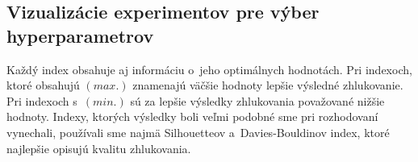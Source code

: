 \documentclass[a4paper,twoside,slovak,12pt,appendix]{article}
\begin{document}
\begin{appendices}
\newpage\null\thispagestyle{empty}\newpage


\newpage
\section{Vizualizácie experimentov pre výber hyperparametrov}
\label{c:clustering-hyperparameters-experiments}
Každý index obsahuje aj informáciu o~jeho optimálnych hodnotách. Pri indexoch,
ktoré obsahujú $(max.)$ znamenajú väčšie hodnoty lepšie výsledné zhlukovanie.
Pri indexoch s~$(min.)$ sú za lepšie výsledky zhlukovania považované nižšie
hodnoty. Indexy, ktorých výsledky boli veľmi podobné sme pri rozhodovaní
vynechali, používali sme najmä Silhouetteov a~Davies-Bouldinov index, ktoré
najlepšie opisujú kvalitu zhlukovania.


\end{appendices}
\end{document}
